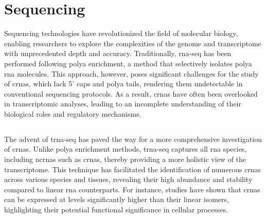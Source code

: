 \section{Sequencing }

Sequencing technologies have revolutionized the field of molecular biology,
enabling researchers to explore the complexities of the genome and
transcriptome with unprecedented depth and accuracy.
Traditionally, \gls{rna-seq} has been performed following \gls{polya}
enrichment, a method that selectively isolates \gls{polya} \gls{rna} molecules.
This approach, however, poses significant challenges for the study of
\glspl{crna}, which lack 5' caps and \gls{polya} tails, rendering them
undetectable in conventional sequencing protocols\supercite{guo_expanded_2014}.
As a result, \glspl{crna} have often been overlooked in transcriptomic
analyses, leading to an incomplete understanding of their biological roles and
regulatory mechanisms.

\subsection{}
The advent of \gls{trna-seq} has paved the way for a more comprehensive
investigation of \glspl{crna}.
Unlike \gls{polya} enrichment methods, \gls{trna-seq} captures all \gls{rna}
species, including \glspl{ncrna} such as \glspl{crna}, thereby providing a more
holistic view of the transcriptome\supercite{panda_identification_2017}.
This technique has facilitated the identification of numerous \glspl{crna}
across various species and tissues, revealing their high abundance and
stability compared to linear \gls{rna}
counterparts\supercite{liu_circular_2016,cao_expression_2018}.
For instance, studies have shown that \glspl{crna} can be expressed at levels
significantly higher than their linear isomers, highlighting their potential
functional significance in cellular processes\supercite{liu_circular_2016}.
